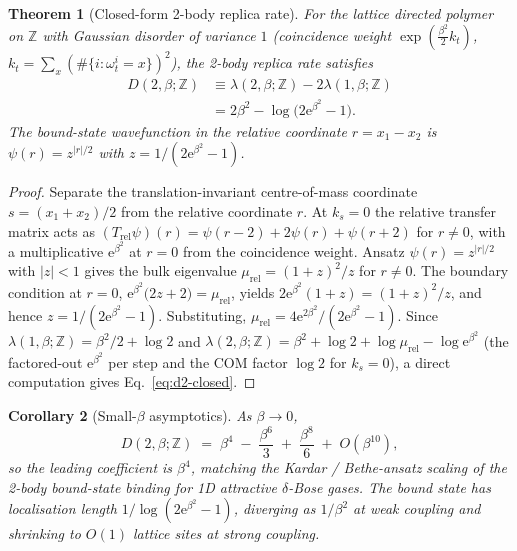 \documentclass[10pt,a4paper,twocolumn]{article}
\theoremstyle{plain}
\newtheorem{theorem}{Theorem}
\newtheorem{corollary}[theorem]{Corollary}
\theoremstyle{definition}
\newcommand{\ee}{\mathrm{e}}
\begin{document}
\begin{theorem}[Closed-form 2-body replica rate]
\label{thm:d2-closed}
For the lattice directed polymer on $\mathbb{Z}$ with Gaussian
disorder of variance $1$ (coincidence weight
$\exp(\tfrac{\beta^2}{2} k_t)$, $k_t = \sum_x (\#\{i: \omega^i_t = x\})^2$),
the 2-body replica rate satisfies
\begin{align}
  D(2, \beta; \mathbb{Z})
  &\equiv \lambda(2, \beta; \mathbb{Z}) - 2 \lambda(1, \beta; \mathbb{Z})
     \nonumber \\
  &= 2\beta^2 - \log\bigl(2 \ee^{\beta^2} - 1\bigr).
  \label{eq:d2-closed}
\end{align}
The bound-state wavefunction in the relative coordinate $r = x_1 -
x_2$ is $\psi(r) = z^{|r|/2}$ with $z = 1/(2\ee^{\beta^2} - 1)$.
\end{theorem}

\begin{proof}
Separate the translation-invariant centre-of-mass coordinate
$s = (x_1 + x_2)/2$ from the relative coordinate $r$.  At
$k_s = 0$ the relative transfer matrix acts as
$(T_{\text{rel}}\psi)(r) = \psi(r-2) + 2\psi(r) + \psi(r+2)$ for
$r \neq 0$, with a multiplicative $\ee^{\beta^2}$ at $r = 0$ from
the coincidence weight.  Ansatz $\psi(r) = z^{|r|/2}$ with
$|z| < 1$ gives the bulk eigenvalue $\mu_{\text{rel}} = (1+z)^2/z$
for $r \neq 0$.  The boundary condition at $r = 0$,
$\ee^{\beta^2}\bigl(2z + 2\bigr) = \mu_{\text{rel}}$, yields
$2\ee^{\beta^2}(1+z) = (1+z)^2 / z$, and hence
$z = 1/(2\ee^{\beta^2} - 1)$.  Substituting,
$\mu_{\text{rel}} = 4\ee^{2\beta^2}/(2\ee^{\beta^2}-1)$.
Since $\lambda(1, \beta; \mathbb{Z}) = \beta^2/2 + \log 2$ and
$\lambda(2, \beta; \mathbb{Z}) = \beta^2 + \log 2 + \log \mu_{\text{rel}}
- \log \ee^{\beta^2}$ (the factored-out $\ee^{\beta^2}$ per step and
the COM factor $\log 2$ for $k_s = 0$), a direct computation gives
Eq.~\eqref{eq:d2-closed}.
\end{proof}

\begin{corollary}[Small-$\beta$ asymptotics]
\label{cor:d2-small}
As $\beta \to 0$,
\[
  D(2, \beta; \mathbb{Z}) \;=\; \beta^4 \;-\; \frac{\beta^6}{3}
   \;+\; \frac{\beta^8}{6} \;+\; O(\beta^{10}),
\]
so the leading coefficient is $\beta^4$, matching the
Kardar / Bethe-ansatz scaling of the 2-body bound-state binding for
1D attractive $\delta$-Bose gases.  The bound state has
localisation length $1 / \log(2 \ee^{\beta^2} - 1)$, diverging
as $1/\beta^2$ at weak coupling and shrinking to $O(1)$ lattice
sites at strong coupling.
\end{corollary}
\end{document}
